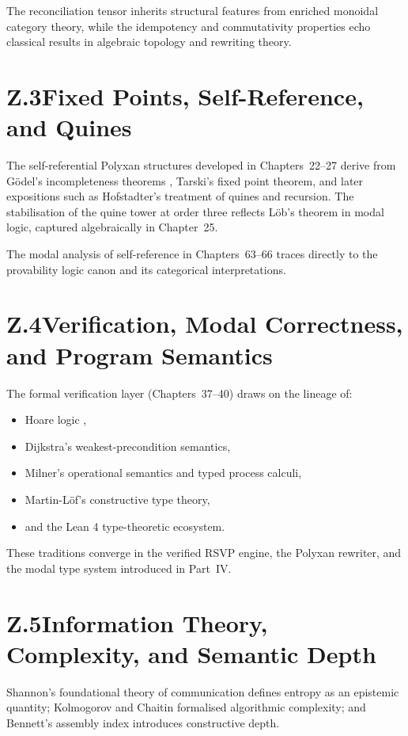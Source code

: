 The reconciliation tensor inherits structural features from enriched monoidal category
theory, while the idempotency and commutativity properties echo classical results
in algebraic topology and rewriting theory.

\section*{Z.3\quad Fixed Points, Self-Reference, and Quines}
The self-referential Polyxan structures developed in Chapters~22--27 derive from
Gödel's incompleteness theorems \cite{godel1931}, Tarski's fixed point theorem,
and later expositions such as Hofstadter's treatment of quines and recursion.
The stabilisation of the quine tower at order three reflects Löb’s theorem in
modal logic, captured algebraically in Chapter~25.

The modal analysis of self-reference in Chapters~63--66 traces directly to the
provability logic canon and its categorical interpretations.

\section*{Z.4\quad Verification, Modal Correctness, and Program Semantics}
The formal verification layer (Chapters~37--40) draws on the lineage of:
\begin{itemize}
    \item Hoare logic \cite{hoare1969axiomatic},
    \item Dijkstra’s weakest-precondition semantics,
    \item Milner’s operational semantics and typed process calculi,
    \item Martin-Löf’s constructive type theory,
    \item and the Lean 4 type-theoretic ecosystem.
\end{itemize}
These traditions converge in the verified RSVP engine, the Polyxan rewriter,
and the modal type system introduced in Part~IV.

\section*{Z.5\quad Information Theory, Complexity, and Semantic Depth}
Shannon’s foundational theory of communication \cite{shannon1948mathematical}
defines entropy as an epistemic quantity; Kolmogorov and Chaitin formalised
algorithmic complexity; and Bennett’s assembly index \cite{bennett1988logical}
introduces constructive depth.

